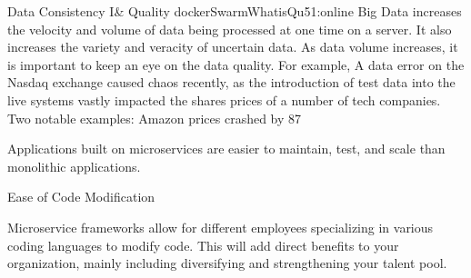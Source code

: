 Data Consistency I\& Quality
dockerSwarmWhatisQu51:online
Big Data increases the velocity and volume of data being processed at one time on a server. It also increases the variety and veracity of uncertain data. As data volume increases, it is important to keep an eye on the data quality. For example, A data error on the Nasdaq exchange caused chaos recently, as the introduction of test data into the live systems vastly impacted the shares prices of a number of tech companies. Two notable examples: Amazon prices crashed by 87%

Applications built on microservices are easier to maintain, test, and scale than monolithic applications.

Ease of Code Modification

Microservice frameworks allow for different employees specializing in various coding languages to modify code. This will add direct benefits to your organization, mainly including diversifying and strengthening your talent pool.

